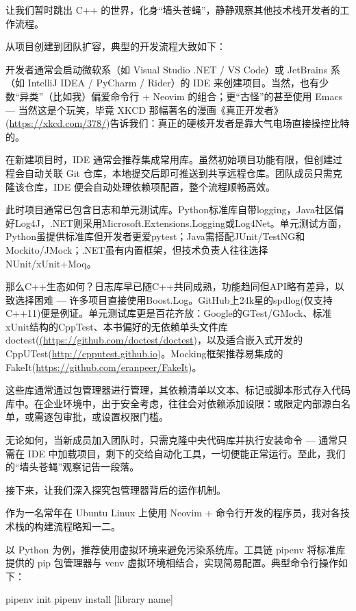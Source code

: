 
让我们暂时跳出 C++ 的世界，化身“墙头苍蝇”，静静观察其他技术栈开发者的工作流程。

从项目创建到团队扩容，典型的开发流程大致如下：

开发者通常会启动微软系（如 Visual Studio .NET / VS Code）或 JetBrains 系（如 IntelliJ IDEA / PyCharm / Rider）的 IDE 来创建项目。当然，也有少数“异类”（比如我）偏爱命令行 + Neovim 的组合；更“古怪”的甚至使用 Emacs --- 当然这是个玩笑，毕竟 XKCD 那幅著名的漫画《真正开发者》(\url{https://xkcd.com/378/})告诉我们：真正的硬核开发者是靠大气电场直接操控比特的。

在新建项目时，IDE 通常会推荐集成常用库。虽然初始项目功能有限，但创建过程会自动关联 Git 仓库，本地提交后即可推送到共享远程仓库。团队成员只需克隆该仓库，IDE 便会自动处理依赖项配置，整个流程顺畅高效。

此时项目通常已包含日志和单元测试库。Python标准库自带logging，Java社区偏好Log4J，.NET则采用Microsoft.Extensions.Logging或Log4Net。单元测试方面，Python虽提供标准库但开发者更爱pytest；Java需搭配JUnit/TestNG和Mockito/JMock；.NET虽有内置框架，但技术负责人往往选择NUnit/xUnit+Moq。

那么C++生态如何？日志库早已随C++共同成熟，功能趋同但API略有差异，以致选择困难 --- 许多项目直接使用Boost.Log。GitHub上24k星的spdlog(仅支持C++11)便是例证。单元测试库更是百花齐放：Google的GTest/GMock、标准xUnit结构的CppTest、本书偏好的无依赖单头文件库doctest(\url{(https://github.com/doctest/doctest})，以及适合嵌入式开发的CppUTest(\url{http://cpputest.github.io})。Mocking框架推荐易集成的FakeIt(\url{https://github.com/eranpeer/FakeIt})。

这些库通常通过包管理器进行管理，其依赖清单以文本、标记或脚本形式存入代码库中。在企业环境中，出于安全考虑，往往会对依赖添加设限：或限定内部源白名单，或需逐包审批，或设置权限门槛。

无论如何，当新成员加入团队时，只需克隆中央代码库并执行安装命令 --- 通常只需在 IDE 中加载项目，剩下的交给自动化工具，一切便能正常运行。至此，我们的“墙头苍蝇”观察记告一段落。

接下来，让我们深入探究包管理器背后的运作机制。

作为一名常年在 Ubuntu Linux 上使用 Neovim + 命令行开发的程序员，我对各技术栈的构建流程略知一二。

以 Python 为例，推荐使用虚拟环境来避免污染系统库。工具链 pipenv 将标准库提供的 pip 包管理器与 venv 虚拟环境相结合，实现简易配置。典型命令行操作如下：

\begin{shell}
pipenv init
pipenv install [library name]
\end{shell}

